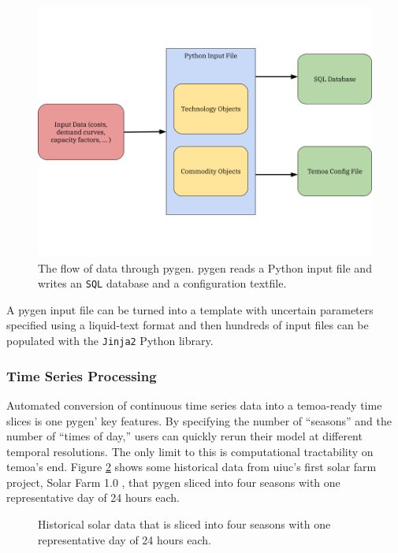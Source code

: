 \begin{figure}[H]
  \centering
  \includegraphics[width=0.8\columnwidth]{figures/pygen-outline.png}
  \caption{The flow of data through \gls{pygen}. \gls{pygen} reads a Python
  input file and writes an \texttt{SQL} database and a configuration textfile.}
  \label{fig:pygen-flow}
\end{figure}
A \gls{pygen} input file can be turned into a template with uncertain parameters
specified using a liquid-text format and then hundreds of input files can be
populated with the \texttt{Jinja2} Python library.

\subsubsection{Time Series Processing}
Automated conversion of continuous time series data into a \gls{temoa}-ready
time slices is one \gls{pygen}' key features. By specifying the number of ``seasons''
and the number of ``times of day,'' users can quickly rerun their model at different
temporal resolutions. The only limit to this is computational tractability on \gls{temoa}'s
end. Figure \ref{fig:solar-timeslice} shows some historical data from \gls{uiuc}'s
first solar farm project, Solar Farm 1.0 \cite{white_solar_2017}, that \gls{pygen}
sliced into four seasons with one representative day of 24 hours each.  
\begin{figure}[H]
  \resizebox{\textwidth}{!}{}
  \caption{Historical solar data that is sliced into four seasons with one
  representative day of 24 hours each.}
  \label{fig:solar-timeslice}
\end{figure}
